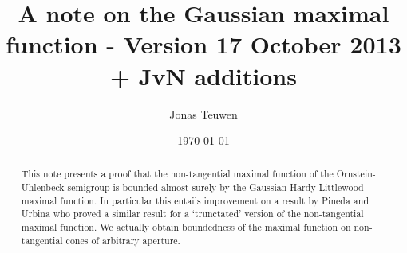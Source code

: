 \documentclass[a4paper,oneside,10pt]{amsproc}
\title[Gaussian maximal functions]{A note on the Gaussian maximal
  function - Version 17 October 2013 + JvN additions}
\author{Jonas Teuwen}%
\date{\today}
\theoremstyle{remark}
\begin{document}
\begin{abstract}
  This note presents a proof that 
  the non-tangential maximal function of the Ornstein-Uhlenbeck semigroup
  is bounded almost surely by the Gaussian Hardy-Littlewood maximal
  function.  In particular this entails improvement on a result by
  Pineda and Urbina \cite{Pineda2008} who proved a similar result for 
  a `trunctated' version of the non-tangential maximal function. 
  We actually obtain boundedness of the maximal function on non-tangential
  cones of arbitrary aperture.
\end{abstract}


\maketitle
\end{document}
